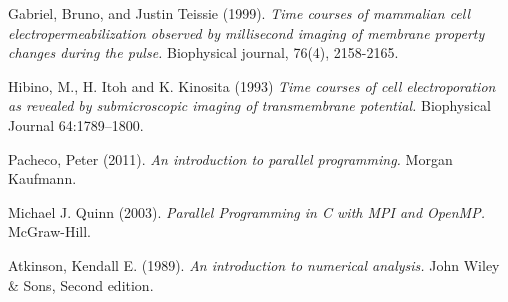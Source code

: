 \begin{thebibliography}{99}
	Gabriel, Bruno, and Justin Teissie (1999). \emph{Time courses of mammalian cell electropermeabilization observed by millisecond imaging of membrane property changes during the pulse.} Biophysical journal, 76(4), 2158-2165.

    Hibino, M., H. Itoh and K. Kinosita (1993) \emph{Time courses of cell electroporation as revealed by submicroscopic imaging of transmembrane potential.} Biophysical Journal 64:1789–1800.

	Pacheco, Peter (2011). \emph{An introduction to parallel programming.} Morgan Kaufmann.

	Michael J. Quinn (2003). \emph{Parallel Programming in C with MPI and OpenMP.} McGraw-Hill.
	
	Atkinson, Kendall E. (1989). \emph{An introduction to numerical analysis.} John Wiley \& Sons, Second edition.

\end{thebibliography}
